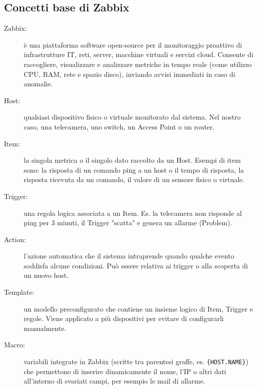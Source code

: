\documentclass[12pt, a4paper]{report}
\begin{document}
\subsection{Concetti base di Zabbix}
{\small%
\begin{description} 
    \item[Zabbix:] è una piattaforma software open-source per il monitoraggio proattivo
     di infrastrutture IT, reti, server, macchine virtuali e servizi cloud. 
     Consente di raccogliere, visualizzare e analizzare metriche in tempo reale 
     (come utilizzo CPU, RAM, rete e spazio disco), inviando avvisi immediati in caso di anomalie.
    \item[Host:] qualsiasi dispositivo fisico o virtuale monitorato dal sistema. 
    Nel nostro caso, una telecamera, uno switch, un Access Point o un router.
    \item[Item:] la singola metrica o il singolo dato raccolto da un Host. 
    Esempi di item sono: la risposta di un comando ping a un host o il tempo di risposta, 
    la risposta ricevuta da un comando, il valore di un sensore fisico o virtuale.
    \item[Trigger:] una regola logica associata a un Item. 
    Es. la telecamera non risponde al ping per 3 minuti, il Trigger "scatta" e genera un allarme (Problem).
    \item[Action:] l'azione automatica che il sistema intraprende quando qualche evento soddisfa alcune condizioni.
    Può essere relativa ai trigger o alla scoperta di un nuovo host.
    \item[Template:] un modello preconfigurato che contiene un insieme logico di 
    Item, Trigger e regole. Viene applicato a più dispositivi per evitare di configurarli manualmente.
    \item[Macro:] variabili integrate in Zabbix (scritte tra parentesi graffe,
    es. \texttt{\{HOST.NAME\}}) che permettono di inserire dinamicamente il nome, 
    l'IP o altri dati all'interno di svariati campi, per esempio le mail di allarme.

\end{description}

}
\end{document}
